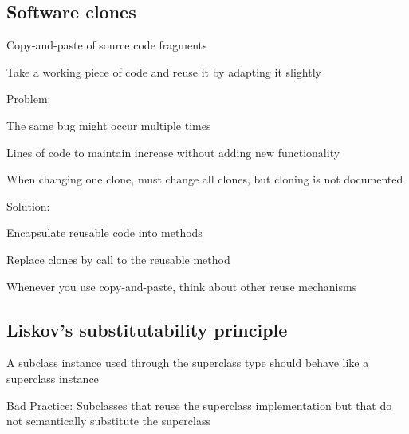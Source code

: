 \documentclass[10pt]{article}
\begin{document}
\subsection{Software clones}
\enumstart
	\item Copy-and-paste of source code fragments
	\item Take a working piece of code and reuse it by adapting it slightly
	\item Problem:
	\enumstart
		\item The same bug might occur multiple times
		\item Lines of code to maintain increase without adding new functionality
		\item When changing one clone, must change all clones, but cloning is not documented
	\enumend
	\item Solution:
	\enumstart
		\item Encapsulate reusable code into methods
		\item Replace clones by call to the reusable method
		\item Whenever you use copy-and-paste, think about other reuse mechanisms
	\enumend
\enumend

\subsection{Liskov's substitutability principle}
\enumstart
	\item A subclass instance used through the superclass type should behave like a superclass instance
	\item Bad Practice: Subclasses that reuse the superclass implementation but that do not semantically substitute the superclass
\enumend
\end{document}
